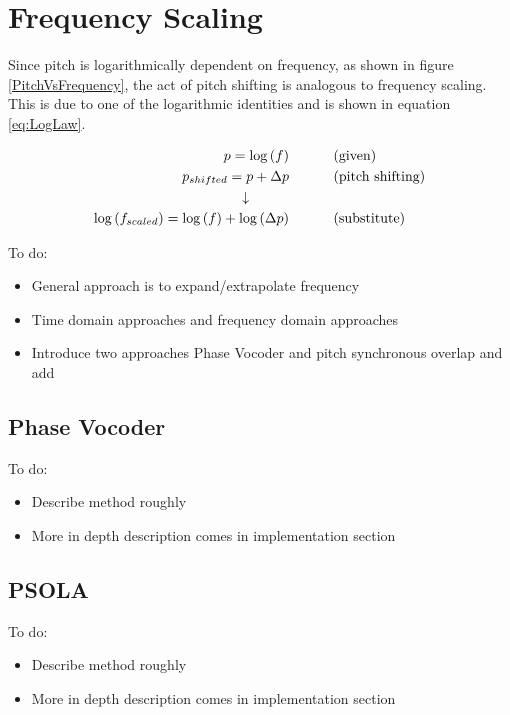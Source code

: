 \section{Frequency Scaling}

Since pitch is logarithmically dependent on frequency, as shown in figure
\ref{PitchVsFrequency}, the act of pitch shifting is analogous to frequency
scaling. This is due to one of the logarithmic identities and is shown in equation
\ref{eq:LogLaw}.

\begin{equation}\label{eq:LogLaw}
\begin{split}
	p=\log{(f)} & \text{\hspace{1cm} (given)}\\
	p_{shifted}=p+\Delta p & \text{\hspace{1cm} (pitch shifting)}\\
	\downarrow \hspace{1cm} \\
	\log{(f_{scaled})}=\log{(f)}+\log{(\Delta p)}
	& \text{\hspace{1cm} (substitute)}
\end{split}
\end{equation}

\color{red}
To do:
\begin{itemize}
	\item General approach is to expand/extrapolate frequency
	\item Time domain approaches and frequency domain approaches
	\item Introduce two approaches Phase Vocoder and pitch synchronous overlap and add
\end{itemize}
\color{black}

\subsection{Phase Vocoder}

\color{red}
To do:
\begin{itemize}
	\item Describe method roughly
	\item More in depth description comes in implementation section
\end{itemize}
\color{black}

\subsection{PSOLA}

\color{red}
To do:
\begin{itemize}
	\item Describe method roughly
	\item More in depth description comes in implementation section
\end{itemize}
\color{black}
